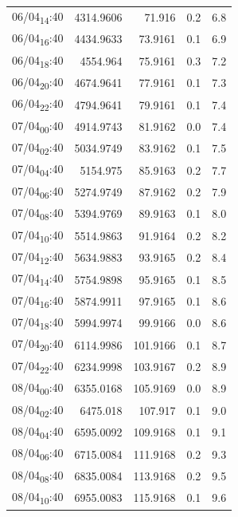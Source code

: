 \documentclass[11pt]{article}
\begin{document}
\begin{center}
\begin{tabular}{lrrrr}
06/04\textsubscript{14}:40 & 4314.9606 & 71.916 & 0.2 & 6.8\\[0pt]
06/04\textsubscript{16}:40 & 4434.9633 & 73.9161 & 0.1 & 6.9\\[0pt]
06/04\textsubscript{18}:40 & 4554.964 & 75.9161 & 0.3 & 7.2\\[0pt]
06/04\textsubscript{20}:40 & 4674.9641 & 77.9161 & 0.1 & 7.3\\[0pt]
06/04\textsubscript{22}:40 & 4794.9641 & 79.9161 & 0.1 & 7.4\\[0pt]
07/04\textsubscript{00}:40 & 4914.9743 & 81.9162 & 0.0 & 7.4\\[0pt]
07/04\textsubscript{02}:40 & 5034.9749 & 83.9162 & 0.1 & 7.5\\[0pt]
07/04\textsubscript{04}:40 & 5154.975 & 85.9163 & 0.2 & 7.7\\[0pt]
07/04\textsubscript{06}:40 & 5274.9749 & 87.9162 & 0.2 & 7.9\\[0pt]
07/04\textsubscript{08}:40 & 5394.9769 & 89.9163 & 0.1 & 8.0\\[0pt]
07/04\textsubscript{10}:40 & 5514.9863 & 91.9164 & 0.2 & 8.2\\[0pt]
07/04\textsubscript{12}:40 & 5634.9883 & 93.9165 & 0.2 & 8.4\\[0pt]
07/04\textsubscript{14}:40 & 5754.9898 & 95.9165 & 0.1 & 8.5\\[0pt]
07/04\textsubscript{16}:40 & 5874.9911 & 97.9165 & 0.1 & 8.6\\[0pt]
07/04\textsubscript{18}:40 & 5994.9974 & 99.9166 & 0.0 & 8.6\\[0pt]
07/04\textsubscript{20}:40 & 6114.9986 & 101.9166 & 0.1 & 8.7\\[0pt]
07/04\textsubscript{22}:40 & 6234.9998 & 103.9167 & 0.2 & 8.9\\[0pt]
08/04\textsubscript{00}:40 & 6355.0168 & 105.9169 & 0.0 & 8.9\\[0pt]
08/04\textsubscript{02}:40 & 6475.018 & 107.917 & 0.1 & 9.0\\[0pt]
08/04\textsubscript{04}:40 & 6595.0092 & 109.9168 & 0.1 & 9.1\\[0pt]
08/04\textsubscript{06}:40 & 6715.0084 & 111.9168 & 0.2 & 9.3\\[0pt]
08/04\textsubscript{08}:40 & 6835.0084 & 113.9168 & 0.2 & 9.5\\[0pt]
08/04\textsubscript{10}:40 & 6955.0083 & 115.9168 & 0.1 & 9.6\\[0pt]
\end{tabular}
\end{center}
\end{document}
